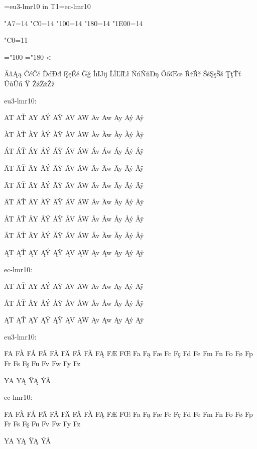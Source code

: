 
%
\parindent=0pt

\font\eulmr=eu3-lmr10
\font in T1\eclmr=ec-lmr10
\eulmr

\kcatcode"A7=14
\kcatcode"C0=14
\kcatcode"100=14
\kcatcode"180=14
\kcatcode"1E00=14

\catcode"C0=11

\newcount\ChrA\newcount\ChrB
\def\SetCatCode#1{%
 \loop\ifnum\ChrA<\ChrB
  \catcode\ChrA=#1
  \sfcode{}
  \advance{}\relax \repeat
}

\ChrA="100 \ChrB="180
\SetCatCode{11}

ĂăĄą ĆćČč ĎďĐđ ĘęĚě Ğğ İıĲĳ ĹĺĽľŁł ŃńŇňŊŋ
ŐőŒœ ŔŕŘř ŚśŞşŠš ŢţŤť ŮůŰű Ÿ ŹźŻżŽž

eu3-lmr10:

AT AŤ AY AÝ AŸ AV AW Av Aw Ay Aý Aÿ

ÀT ÀŤ ÀY ÀÝ ÀŸ ÀV ÀW Àv Àw Ày Àý Àÿ

ÁT ÁŤ ÁY ÁÝ ÁŸ ÁV ÁW Áv Áw Áy Áý Áÿ

ÂT ÂŤ ÂY ÂÝ ÂŸ ÂV ÂW Âv Âw Ây Âý Âÿ

ÃT ÃŤ ÃY ÃÝ ÃŸ ÃV ÃW Ãv Ãw Ãy Ãý Ãÿ

ÄT ÄŤ ÄY ÄÝ ÄŸ ÄV ÄW Äv Äw Äy Äý Äÿ

ÅT ÅŤ ÅY ÅÝ ÅŸ ÅV ÅW Åv Åw Åy Åý Åÿ

ĂT ĂŤ ĂY ĂÝ ĂŸ ĂV ĂW Ăv Ăw Ăy Ăý Ăÿ

ĄT ĄŤ ĄY ĄÝ ĄŸ ĄV ĄW Ąv Ąw Ąy Ąý Ąÿ

{
\eclmr

ec-lmr10:

AT AŤ AY AÝ AŸ AV AW Av Aw Ay Aý Aÿ

ÅT ÅŤ ÅY ÅÝ ÅŸ ÅV ÅW Åv Åw Åy Åý Åÿ

ĄT ĄŤ ĄY ĄÝ ĄŸ ĄV ĄW Ąv Ąw Ąy Ąý Ąÿ
}

eu3-lmr10:

FA FÀ FÁ FÂ FÃ FÄ FÅ FĂ FĄ FÆ FŒ Fa Fą Fæ Fc Fç Fd Fe Fm Fn Fo Fø Fp Fr Fs Fş Fu Fv Fw Fy Fz

\hbox{YA}
\hbox{YĄ}
\hbox{ŸĄ}
\hbox{ÝÅ}

{
\eclmr

ec-lmr10:

FA FÀ FÁ FÂ FÃ FÄ FÅ FĂ FĄ FÆ FŒ Fa Fą Fæ Fc Fç Fd Fe Fm Fn Fo Fø Fp Fr Fs Fş Fu Fv Fw Fy Fz

\hbox{YA}
\hbox{YĄ}
\hbox{ŸĄ}
\hbox{ÝÅ}
}

